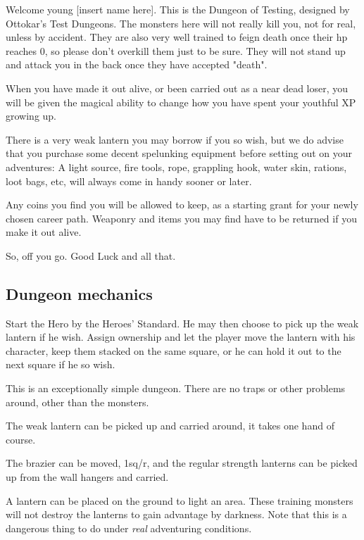 \begin{readoutloud}
Welcome young [insert name here]. This is the Dungeon of Testing, designed by Ottokar's Test Dungeons. The monsters here will not really kill you, not for real, unless by accident. They are also very well trained to feign death once their hp reaches 0, so please don't overkill them just to be sure. They will not stand up and attack you in the back once they have accepted "death".

When you have made it out alive, or been carried out as a near dead loser, you will be given the magical ability to change how you have spent your youthful XP growing up.

There is a very weak lantern you may borrow if you so wish, but we do advise that you purchase some decent spelunking equipment before setting out on your adventures: A light source, fire tools, rope, grappling hook, water skin, rations, loot bags, etc, will always come in handy sooner or later.

Any coins you find you will be allowed to keep, as a starting grant for your newly chosen career path. Weaponry and items you may find have to be returned if you make it out alive.

So, off you go. Good Luck and all that.
\end{readoutloud}





\subsection*{Dungeon mechanics}

Start the Hero by the Heroes' Standard. He may then choose to pick up the weak lantern if he wish. Assign ownership and let the player move the lantern with his character, keep them stacked on the same square, or he can hold it out to the next square if he so wish.

This is an exceptionally simple dungeon. There are no traps or other problems around, other than the monsters.

The weak lantern can be picked up and carried around, it takes one hand of course.

The brazier can be moved, 1sq/r, and the regular strength lanterns can be picked up from the wall hangers and carried.

A lantern can be placed on the ground to light an area. These training monsters will not destroy the lanterns to gain advantage by darkness. Note that this is a dangerous thing to do under \emph{real} adventuring conditions.




